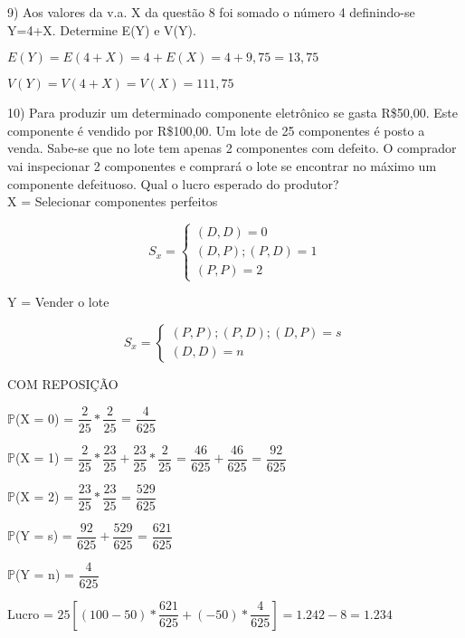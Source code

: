 \documentclass[12pt,a4paper]{article}
\begin{document}
\vspace{1cm}
9) Aos valores da v.a. X da questão 8 foi somado o número 4 definindo-se Y=4+X. Determine E(Y) e V(Y).

\begin{center}
	\vspace{0.25cm}
	$E(Y) = E(4 + X) = 4 + E(X) = 4 + 9,75 = 13,75$ 
	
	\vspace{1cm}
	$V(Y) = V(4 + X) = V(X) = 111,75$
\end{center}

\vspace{1cm}
10) Para produzir um determinado componente eletrônico se gasta R\$50,00. Este componente é vendido por R\$100,00. Um lote de 25 componentes é posto a venda. Sabe-se que no lote tem apenas 2 componentes com defeito. O comprador vai inspecionar 2 componentes e comprará o lote se encontrar no máximo um componente defeituoso. Qual o lucro esperado do produtor?
\vspace{0.5cm}\\
X = Selecionar componentes perfeitos
\begin{center}	
	\[
	S_{x} =
	\begin{cases}
	(D,D) = 0 \\
	(D,P);(P,D) = 1\\
	(P,P) = 2
	\end{cases}
	\]
\end{center}
\vspace{1cm}
Y = Vender o lote
\begin{center}
	\[
	S_{x} =
	\begin{cases}
	(P,P); (P,D); (D,P) = s \\
	(D,D) = n
	\end{cases}
	\]
\end{center}

\vspace{0.25cm}
COM REPOSIÇÃO

\begin{center}	
	\vspace{0.5cm}
	$\mathbb{P}$(X = 0) = $\dfrac{2}{25}*\dfrac{2}{25}$ = $\dfrac{4}{625}$
	
	\vspace{0.5cm}
	$\mathbb{P}$(X = 1) = $\dfrac{2}{25}*\dfrac{23}{25} + \dfrac{23}{25}*\dfrac{2}{25}$ = $\dfrac{46}{625} + \dfrac{46}{625}$ = $\dfrac{92}{625}$
	
	\vspace{0.5cm}
	$\mathbb{P}$(X = 2) = $\dfrac{23}{25}*\dfrac{23}{25}$ = $\dfrac{529}{625}$

	\vspace{1cm}
	$\mathbb{P}$(Y = s) = $\dfrac{92}{625} + \dfrac{529}{625}$ = $\dfrac{621}{625}$

	\vspace{0.5cm}
	$\mathbb{P}$(Y = n) = $\dfrac{4}{625}$

	\vspace{1cm}
	Lucro = $ 25\left[(100 - 50) * \dfrac{621}{625} + (-50) * \dfrac{4}{625}\right] = 1.242 - 8 = 1.234$
\end{center}
\end{document}

